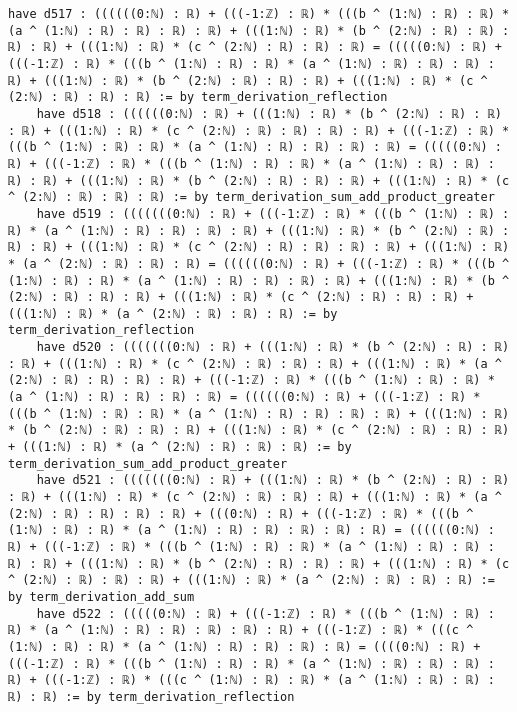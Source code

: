 \documentclass{article}
\begin{document}
\begin{tcolorbox}[colback=white!10, width=\linewidth]
\begin{lstlisting}[language=Lean4]
    have d517 : ((((((0:ℕ) : ℝ) + (((-1:ℤ) : ℝ) * (((b ^ (1:ℕ) : ℝ) : ℝ) * (a ^ (1:ℕ) : ℝ) : ℝ) : ℝ) : ℝ) + (((1:ℕ) : ℝ) * (b ^ (2:ℕ) : ℝ) : ℝ) : ℝ) : ℝ) + (((1:ℕ) : ℝ) * (c ^ (2:ℕ) : ℝ) : ℝ) : ℝ) = (((((0:ℕ) : ℝ) + (((-1:ℤ) : ℝ) * (((b ^ (1:ℕ) : ℝ) : ℝ) * (a ^ (1:ℕ) : ℝ) : ℝ) : ℝ) : ℝ) + (((1:ℕ) : ℝ) * (b ^ (2:ℕ) : ℝ) : ℝ) : ℝ) + (((1:ℕ) : ℝ) * (c ^ (2:ℕ) : ℝ) : ℝ) : ℝ) := by term_derivation_reflection
    have d518 : ((((((0:ℕ) : ℝ) + (((1:ℕ) : ℝ) * (b ^ (2:ℕ) : ℝ) : ℝ) : ℝ) + (((1:ℕ) : ℝ) * (c ^ (2:ℕ) : ℝ) : ℝ) : ℝ) : ℝ) + (((-1:ℤ) : ℝ) * (((b ^ (1:ℕ) : ℝ) : ℝ) * (a ^ (1:ℕ) : ℝ) : ℝ) : ℝ) : ℝ) = (((((0:ℕ) : ℝ) + (((-1:ℤ) : ℝ) * (((b ^ (1:ℕ) : ℝ) : ℝ) * (a ^ (1:ℕ) : ℝ) : ℝ) : ℝ) : ℝ) + (((1:ℕ) : ℝ) * (b ^ (2:ℕ) : ℝ) : ℝ) : ℝ) + (((1:ℕ) : ℝ) * (c ^ (2:ℕ) : ℝ) : ℝ) : ℝ) := by term_derivation_sum_add_product_greater
    have d519 : (((((((0:ℕ) : ℝ) + (((-1:ℤ) : ℝ) * (((b ^ (1:ℕ) : ℝ) : ℝ) * (a ^ (1:ℕ) : ℝ) : ℝ) : ℝ) : ℝ) + (((1:ℕ) : ℝ) * (b ^ (2:ℕ) : ℝ) : ℝ) : ℝ) + (((1:ℕ) : ℝ) * (c ^ (2:ℕ) : ℝ) : ℝ) : ℝ) : ℝ) + (((1:ℕ) : ℝ) * (a ^ (2:ℕ) : ℝ) : ℝ) : ℝ) = ((((((0:ℕ) : ℝ) + (((-1:ℤ) : ℝ) * (((b ^ (1:ℕ) : ℝ) : ℝ) * (a ^ (1:ℕ) : ℝ) : ℝ) : ℝ) : ℝ) + (((1:ℕ) : ℝ) * (b ^ (2:ℕ) : ℝ) : ℝ) : ℝ) + (((1:ℕ) : ℝ) * (c ^ (2:ℕ) : ℝ) : ℝ) : ℝ) + (((1:ℕ) : ℝ) * (a ^ (2:ℕ) : ℝ) : ℝ) : ℝ) := by term_derivation_reflection
    have d520 : (((((((0:ℕ) : ℝ) + (((1:ℕ) : ℝ) * (b ^ (2:ℕ) : ℝ) : ℝ) : ℝ) + (((1:ℕ) : ℝ) * (c ^ (2:ℕ) : ℝ) : ℝ) : ℝ) + (((1:ℕ) : ℝ) * (a ^ (2:ℕ) : ℝ) : ℝ) : ℝ) : ℝ) + (((-1:ℤ) : ℝ) * (((b ^ (1:ℕ) : ℝ) : ℝ) * (a ^ (1:ℕ) : ℝ) : ℝ) : ℝ) : ℝ) = ((((((0:ℕ) : ℝ) + (((-1:ℤ) : ℝ) * (((b ^ (1:ℕ) : ℝ) : ℝ) * (a ^ (1:ℕ) : ℝ) : ℝ) : ℝ) : ℝ) + (((1:ℕ) : ℝ) * (b ^ (2:ℕ) : ℝ) : ℝ) : ℝ) + (((1:ℕ) : ℝ) * (c ^ (2:ℕ) : ℝ) : ℝ) : ℝ) + (((1:ℕ) : ℝ) * (a ^ (2:ℕ) : ℝ) : ℝ) : ℝ) := by term_derivation_sum_add_product_greater
    have d521 : (((((((0:ℕ) : ℝ) + (((1:ℕ) : ℝ) * (b ^ (2:ℕ) : ℝ) : ℝ) : ℝ) + (((1:ℕ) : ℝ) * (c ^ (2:ℕ) : ℝ) : ℝ) : ℝ) + (((1:ℕ) : ℝ) * (a ^ (2:ℕ) : ℝ) : ℝ) : ℝ) : ℝ) + (((0:ℕ) : ℝ) + (((-1:ℤ) : ℝ) * (((b ^ (1:ℕ) : ℝ) : ℝ) * (a ^ (1:ℕ) : ℝ) : ℝ) : ℝ) : ℝ) : ℝ) = ((((((0:ℕ) : ℝ) + (((-1:ℤ) : ℝ) * (((b ^ (1:ℕ) : ℝ) : ℝ) * (a ^ (1:ℕ) : ℝ) : ℝ) : ℝ) : ℝ) + (((1:ℕ) : ℝ) * (b ^ (2:ℕ) : ℝ) : ℝ) : ℝ) + (((1:ℕ) : ℝ) * (c ^ (2:ℕ) : ℝ) : ℝ) : ℝ) + (((1:ℕ) : ℝ) * (a ^ (2:ℕ) : ℝ) : ℝ) : ℝ) := by term_derivation_add_sum
    have d522 : (((((0:ℕ) : ℝ) + (((-1:ℤ) : ℝ) * (((b ^ (1:ℕ) : ℝ) : ℝ) * (a ^ (1:ℕ) : ℝ) : ℝ) : ℝ) : ℝ) : ℝ) + (((-1:ℤ) : ℝ) * (((c ^ (1:ℕ) : ℝ) : ℝ) * (a ^ (1:ℕ) : ℝ) : ℝ) : ℝ) : ℝ) = ((((0:ℕ) : ℝ) + (((-1:ℤ) : ℝ) * (((b ^ (1:ℕ) : ℝ) : ℝ) * (a ^ (1:ℕ) : ℝ) : ℝ) : ℝ) : ℝ) + (((-1:ℤ) : ℝ) * (((c ^ (1:ℕ) : ℝ) : ℝ) * (a ^ (1:ℕ) : ℝ) : ℝ) : ℝ) : ℝ) := by term_derivation_reflection

\end{lstlisting}
\end{tcolorbox}
\end{document}
